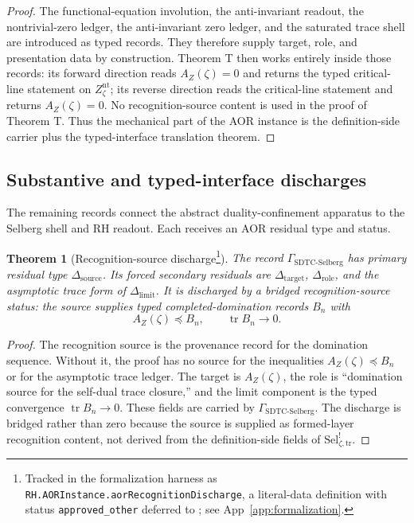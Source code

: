 \documentclass[11pt]{article}
\DeclareMathOperator{\trace}{tr}
\newcommand{\Znt}{Z_{\zeta}^{\mathrm{nt}}}
\newcommand{\AZ}{A_{Z}(\zeta)}
\newcommand{\Sel}{\mathrm{Sel}^{!}_{\zeta,\mathrm{tr}}}
\newcommand{\GamSDTCSelberg}{\Gamma_{\mathrm{SDTC\text{-}Selberg}}}
\newtheorem{theorem}{Theorem}[section]
\theoremstyle{definition}
\begin{document}
\begin{proof}
The functional-equation involution, the anti-invariant readout, the
nontrivial-zero ledger, the anti-invariant zero ledger, and the
saturated trace shell are introduced as typed records.  They therefore
supply target, role, and presentation data by construction.  Theorem T
then works entirely inside those records: its forward direction reads
\(\AZ=0\) and returns the typed critical-line statement on \(\Znt\);
its reverse direction reads the critical-line statement and returns
\(\AZ=0\).  No recognition-source content is used in the proof of
Theorem T.  Thus the mechanical part of the AOR instance is the
definition-side carrier plus the typed-interface translation theorem.
\end{proof}

\subsection{Substantive and typed-interface discharges}

The remaining records connect the abstract duality-confinement
apparatus to the Selberg shell and RH readout.  Each receives an AOR
residual type and status.

\begin{theorem}[Recognition-source discharge\footnote{Tracked in the formalization harness as \nolinkurl{RH.AORInstance.aorRecognitionDischarge}, a literal-data definition with status \texttt{approved\_other} deferred to \cite{TsiokosSDTC2026}; see App~\ref{app:formalization}.}]
\label{thm:rh:aor-recognition-discharge}
The record \(\GamSDTCSelberg\) has primary residual type
\(\Delta_{\mathrm{source}}\).  Its forced secondary residuals are
\(\Delta_{\mathrm{target}}\), \(\Delta_{\mathrm{role}}\), and the
asymptotic trace form of \(\Delta_{\mathrm{limit}}\).  It is
discharged by a bridged recognition-source status: the source supplies
typed completed-domination records \(B_n\) with
\[
  \AZ\preceq B_n,
  \qquad
  \trace B_n\to0.
\]
\end{theorem}

\begin{proof}
The recognition source is the provenance record for the domination
sequence.  Without it, the proof has no source for the inequalities
\(\AZ\preceq B_n\) or for the asymptotic trace ledger.  The target is
\(\AZ\), the role is ``domination source for the self-dual trace
closure,'' and the limit component is the typed convergence
\(\trace B_n\to0\).  These fields are carried by
\(\GamSDTCSelberg\).  The discharge is bridged rather than zero because
the source is supplied as formed-layer recognition content, not
derived from the definition-side fields of \(\Sel\).
\end{proof}
\end{document}
